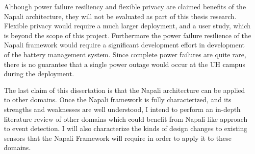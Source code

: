 Although power failure resiliency and flexible privacy are claimed benefits of the Napali architecture, they will not be evaluated as part of this thesis research.
Flexible privacy would require a much larger deployment, and a user study, which is beyond the scope of this project.
Furthermore the power failure resilience of the Napali framework would require a significant development effort in development of the battery management system.
Since complete power failures are quite rare, there is no guarantee that a single power outage would occur at the UH campus during the deployment.


The last claim of this dissertation is that the Napali architecture can be applied to other domains.
Once the Napali framework is fully characterized, and its strengths and weaknesses are well understood, I intend to perform an in-depth literature review of other domains which could benefit from Napali-like approach to event detection.
I will also characterize the kinds of design changes to existing sensors that the Napali Framework will require in order to apply it to these domains.

